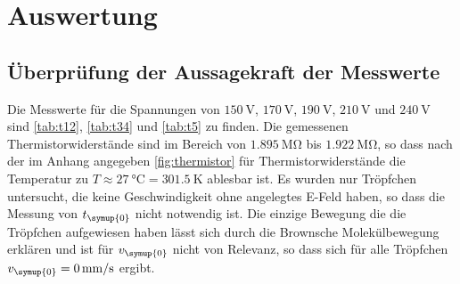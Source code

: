 \section{Auswertung}
\label{sec:Auswertung}  

\subsection{Überprüfung der Aussagekraft der Messwerte}
\label{sec:Überprüfung}
Die Messwerte für die Spannungen von $\SI{150}{\volt}$, $\SI{170}{\volt}$, $\SI{190}{\volt}$, $\SI{210}{\volt}$
und $\SI{240}{\volt}$ sind \autoref{tab:t12}, \autoref{tab:t34} und \autoref{tab:t5} zu finden. Die gemessenen  
Thermistorwiderstände sind im Bereich von $\SI{1,895}{\mega\ohm}$ bis $\SI{1,922}{\mega\ohm}$, so dass nach der
im Anhang angegeben \autoref{fig:thermistor} für Thermistorwiderstände die
Temperatur zu $T\approx \SI{27}{\celsius} = \SI{301,5}{\kelvin}$ ablesbar ist. Es wurden nur Tröpfchen untersucht,
die keine Geschwindigkeit ohne angelegtes E-Feld haben, so dass die Messung von $t_{\symup{0}}$ nicht notwendig
ist. Die einzige Bewegung die die Tröpfchen aufgewiesen haben lässt sich durch die Brownsche Molekülbewegung
erklären und ist für $v_{\symup{0}}$ nicht von Relevanz, so dass sich für alle Tröpfchen
$v_{\symup{0}} = \SI{0}{\milli\meter\per\second}$ ergibt.
